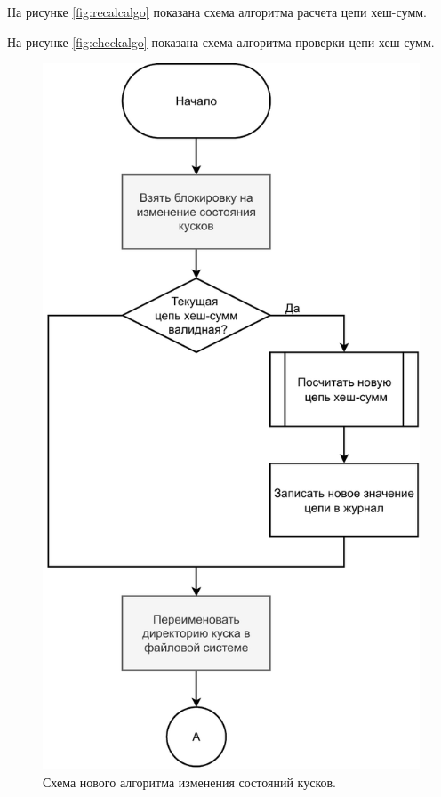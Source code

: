 На рисунке \ref{fig:recalcalgo} показана схема алгоритма расчета цепи хеш-сумм.

На рисунке \ref{fig:checkalgo} показана схема алгоритма проверки цепи хеш-сумм.


\begin{figure}[hbtp]
	\centering
	\includegraphics[scale=0.8]{img/mainalgo.pdf}
	\caption{Схема нового алгоритма изменения состояний кусков.}
	\label{fig:mainalgo}
\end{figure}
